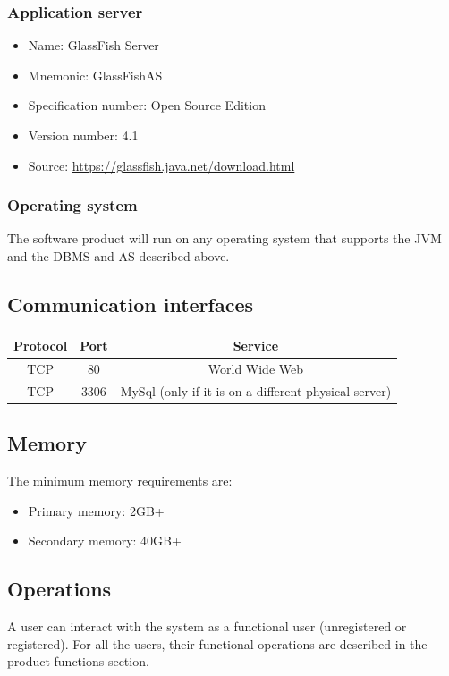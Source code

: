 \documentclass[10pt,a4paper,titlepage]{article}
\begin{document}
\subsubsection{Application server}
\begin{itemize}
\item Name: GlassFish Server
\item Mnemonic: GlassFishAS
\item Specification number: Open Source Edition
\item Version number: 4.1
\item Source: \url{https://glassfish.java.net/download.html}
\end{itemize}

\subsubsection{Operating system}
The software product will run on any operating system that supports the JVM and the DBMS and AS described above.

\subsection{Communication interfaces}
\begin{tabular}{|c|c|c|}
\hline Protocol & Port & Service \\ 
\hline TCP & 80 & World Wide Web \\ 
\hline TCP & 3306 & MySql (only if it is on a different physical server) \\ 
\hline 
\end{tabular}

\subsection{Memory}
The minimum memory requirements are:
\begin{itemize}
\item Primary memory: 2GB+
\item Secondary memory: 40GB+
\end{itemize}

\subsection{Operations}
A user can interact with the system as a functional user (unregistered or registered). For all the users, their functional operations are described in the product functions section.
\end{document}
